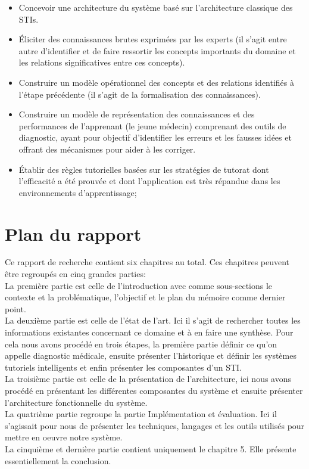 \begin{itemize}
    \item Concevoir une architecture du système basé sur l'architecture classique des STIs.
    \item Éliciter des connaissances brutes exprimées par les experts (il s'agit entre autre d'identifier et de faire ressortir les concepts importants du domaine et les relations significatives entre ces concepts).
    \item Construire un modèle opérationnel des concepts et des relations identifiés à l'étape précédente (il s'agit de la formalisation des connaissances).
    \item Construire un modèle de représentation des connaissances et des performances de l'apprenant (le jeune médecin) comprenant des outils de diagnostic, ayant pour objectif d'identifier les erreurs et les fausses idées et offrant des mécanismes pour aider à les corriger.
    \item Établir des règles tutorielles basées sur les stratégies de tutorat dont l'efficacité a été prouvée et dont l'application est très répandue dans les environnements d'apprentissage;
\end{itemize}


\newpage

\section{Plan du rapport}
Ce rapport de recherche contient six chapitres au total. Ces chapitres peuvent être regroupés en cinq grandes parties:\\
La première partie est celle de l'introduction avec comme sous-sections le contexte et la problématique, l'objectif et le plan du mémoire comme dernier point.\\
La deuxième partie est celle de l'état de l'art. Ici il s'agit de rechercher toutes les informations existantes concernant ce domaine et à en faire une synthèse. Pour cela nous avons procédé en trois étapes, la première partie définir ce qu'on appelle diagnostic médicale, ensuite présenter l'historique et définir les systèmes tutoriels intelligents et enfin présenter les composantes d'un STI.  \\
La troisième partie est celle de la présentation de l'architecture, ici nous avons procédé en présentant les différentes composantes du système et ensuite présenter l'architecture fonctionnelle du système.\\
La quatrième partie regroupe la partie Implémentation et évaluation. Ici il s'agissait pour nous de présenter les techniques, langages et les outils utilisés pour mettre en oeuvre notre système. \\
La cinquième et dernière partie contient uniquement le chapitre 5. Elle présente essentiellement la conclusion.\\